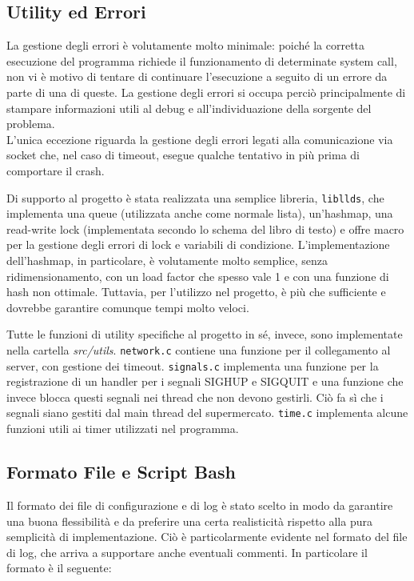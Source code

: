 \documentclass[a4paper,11pt] {article}
\begin{document}
\subsection*{Utility ed Errori}

La gestione degli errori è volutamente molto minimale: poiché la corretta esecuzione del programma richiede il funzionamento di determinate system call, non vi è motivo di tentare di continuare l'esecuzione a seguito di un errore da parte di una di queste. La gestione degli errori si occupa perciò principalmente di stampare informazioni utili al debug e all'individuazione della sorgente del problema.\\
L'unica eccezione riguarda la gestione degli errori legati alla comunicazione via socket che, nel caso di timeout, esegue qualche tentativo in più prima di comportare il crash.

Di supporto al progetto è stata realizzata una semplice libreria, \lstinline{libllds}, che implementa una queue (utilizzata anche come normale lista), un'hashmap, una read-write lock (implementata secondo lo schema del libro di testo) e offre macro per la gestione degli errori di lock e variabili di condizione. L'implementazione dell'hashmap, in particolare, è volutamente molto semplice, senza ridimensionamento, con un load factor che spesso vale 1 e con una funzione di hash non ottimale. Tuttavia, per l'utilizzo nel progetto, è più che sufficiente e dovrebbe garantire comunque tempi molto veloci.

Tutte le funzioni di utility specifiche al progetto in sé, invece, sono implementate nella cartella \textit{src/utils}. \lstinline{network.c} contiene una funzione per il collegamento al server, con gestione dei timeout. \lstinline{signals.c} implementa una funzione per la registrazione di un handler per i segnali SIGHUP e SIGQUIT e una funzione che invece blocca questi segnali nei thread che non devono gestirli. Ciò fa sì che i segnali siano gestiti dal main thread del supermercato. \lstinline{time.c} implementa alcune funzioni utili ai timer utilizzati nel programma.

\subsection*{Formato File e Script Bash}

Il formato dei file di configurazione e di log è stato scelto in modo da garantire una buona flessibilità e da preferire una certa realisticità rispetto alla pura semplicità di implementazione. Ciò è particolarmente evidente nel formato del file di log, che arriva a supportare anche eventuali commenti. In particolare il formato è il seguente:
\end{document}
